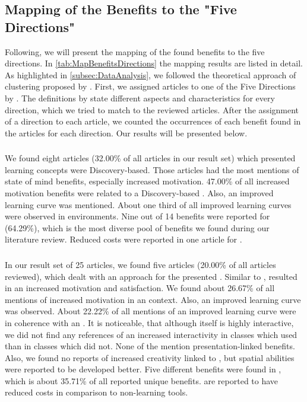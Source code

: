 \subsection{Mapping of the Benefits to the "Five Directions"}
\label{subsec:Mapping}
Following, we will present the mapping of the found benefits to the five directions. In \ref{tab:MapBenefitsDirections} the mapping results are listed in detail. \\
As highlighted in \ref{subsec:DataAnalysis}, we followed the theoretical approach of clustering proposed by \cite{Jankowicz.2004}.\autocite[cf.][149]{Jankowicz.2004} First, we assigned articles to one of the Five Directions by \cite{Yuen.2011}.\autocite[cf.][127-130]{Yuen.2011} The definitions by \cite{Yuen.2011} state different aspects and characteristics for every direction, which we tried to match to the reviewed articles. After the assignment of a direction to each article, we counted the occurrences of each benefit found in the articles for each direction. Our results will be presented below.

\subsubsection{\DBLns}
\label{subsubsec:DiscoveryBasedLearning}
We found eight articles (32.00\% of all articles in our result set) which presented learning concepts were Discovery-based. Those articles had the most mentions of state of mind benefits, especially increased motivation. 47.00\% of all increased motivation benefits were related to a Discovery-based \AR \appns. Also, an improved learning curve was mentioned. About one third of all improved learning curves were observed in \DBL environments. Nine out of 14 benefits were reported for \DBL \apps (64.29\%), which is the most diverse pool of benefits we found during our literature review. Reduced costs were reported in one article for \DBL \appsns.

\subsubsection{\OMns}
In our result set of 25 articles, we found five articles (20.00\% of all articles reviewed), which dealt with an \OM approach for the presented \AR \appns. Similar to \DBL \appsns, \OM resulted in an increased motivation and satisfaction. We found about 26.67\% of all mentions of increased motivation in an \OM context. Also, an improved learning curve was observed. About 22.22\% of all mentions of an improved learning curve were in coherence with an \OM \appns. It is noticeable, that although \OM itself is highly interactive, we did not find any references of an increased interactivity in classes which used \AR than in classes which did not. None of the \OM \apps mention presentation-linked benefits. Also, we found no reports of increased creativity linked to \OM, but spatial abilities were reported to be developed better. Five different benefits were found in \OM \appsns, which is about 35.71\% of all reported unique benefits. \OM \apps are reported to have reduced costs in comparison to non-\AR learning tools.

